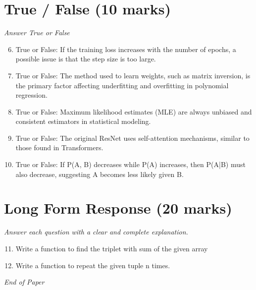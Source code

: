 \documentclass[12pt]{article}
\begin{document}
\section*{True / False (10 marks)}
\textit{Answer True or False}
\begin{enumerate}[label=\arabic*.]
\setcounter{enumi}{5}
\item True or False: If the training loss increases with the number of epochs, a possible issue is that the step size is too large.
\item True or False: The method used to learn weights, such as matrix inversion, is the primary factor affecting underfitting and overfitting in polynomial regression.
\item True or False: Maximum likelihood estimates (MLE) are always unbiased and consistent estimators in statistical modeling.
\item True or False: The original ResNet uses self-attention mechanisms, similar to those found in Transformers.
\item True or False: If P(A, B) decreases while P(A) increases, then P(A|B) must also decrease, suggesting A becomes less likely given B.
\end{enumerate}

\section*{Long Form Response (20 marks)}
\textit{Answer each question with a clear and complete explanation.}
\begin{enumerate}[label=\arabic*.]
\setcounter{enumi}{10}
\item Write a function to find the triplet with sum of the given array
\item Write a function to repeat the given tuple n times.
\end{enumerate}

\vfill
\noindent\textit{End of Paper}
\end{document}
